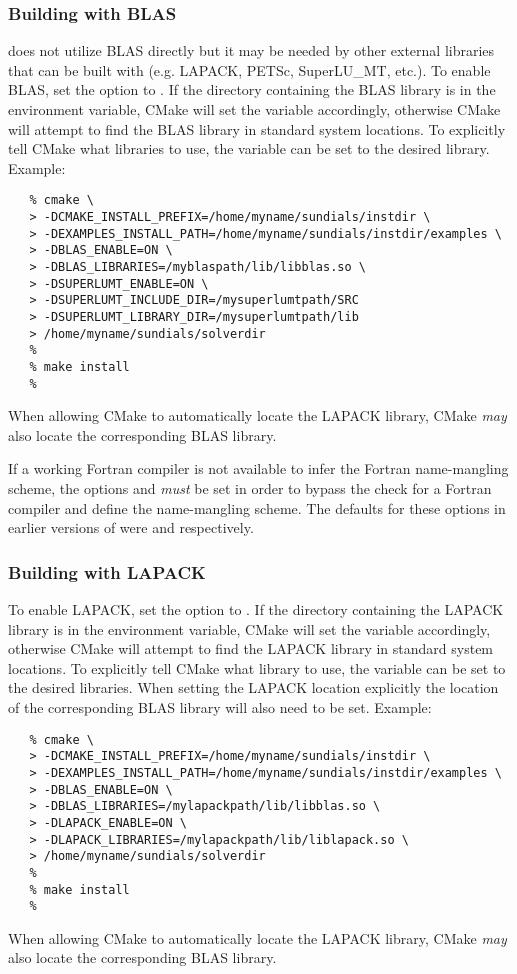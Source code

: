 \subsubsection*{Building with BLAS}
{\sundials} does not utilize BLAS directly but it may be needed by other
external libraries that {\sundials} can be built with (e.g. LAPACK,
PETSc, SuperLU\_MT, etc.). To enable BLAS, set the 
option to . If the directory containing the BLAS library is in
the  environment variable, CMake will set the
 variable accordingly, otherwise CMake will
attempt to find the BLAS library in standard system locations. To
explicitly tell CMake what libraries to use, the 
variable can be set to the desired library. Example:
\begin{verbatim}
   % cmake \
   > -DCMAKE_INSTALL_PREFIX=/home/myname/sundials/instdir \
   > -DEXAMPLES_INSTALL_PATH=/home/myname/sundials/instdir/examples \
   > -DBLAS_ENABLE=ON \
   > -DBLAS_LIBRARIES=/myblaspath/lib/libblas.so \
   > -DSUPERLUMT_ENABLE=ON \
   > -DSUPERLUMT_INCLUDE_DIR=/mysuperlumtpath/SRC
   > -DSUPERLUMT_LIBRARY_DIR=/mysuperlumtpath/lib
   > /home/myname/sundials/solverdir
   %
   % make install
   % 
\end{verbatim}
{\warn}When allowing CMake to automatically locate the LAPACK library,
CMake \textit{may} also locate the corresponding BLAS library.

If a working Fortran compiler is not available to infer the Fortran
name-mangling scheme, the options  and
\id{SUNDIALS\_F77\_FUNC\_UNDERSCORES} \textit{must} be set in order to
bypass the check for a Fortran compiler and define the name-mangling
scheme. The defaults for these options in earlier versions of
{\sundials} were \id{lower} and \id{one} respectively.


\subsubsection*{Building with LAPACK}
To enable LAPACK, set the \id{LAPACK\_ENABLE} option to .
If the directory containing the LAPACK library is in the
 environment variable, CMake will set the
 variable accordingly, otherwise CMake will
attempt to find the LAPACK library in standard system locations. To
explicitly tell CMake what library to use, the 
variable can be set to the desired libraries. {\warn}When setting
the LAPACK location explicitly the location of the corresponding BLAS
library will also need to be set. Example:
\begin{verbatim}
   % cmake \
   > -DCMAKE_INSTALL_PREFIX=/home/myname/sundials/instdir \
   > -DEXAMPLES_INSTALL_PATH=/home/myname/sundials/instdir/examples \
   > -DBLAS_ENABLE=ON \
   > -DBLAS_LIBRARIES=/mylapackpath/lib/libblas.so \
   > -DLAPACK_ENABLE=ON \
   > -DLAPACK_LIBRARIES=/mylapackpath/lib/liblapack.so \
   > /home/myname/sundials/solverdir
   %
   % make install
   % 
\end{verbatim}
{\warn}When allowing CMake to automatically locate the LAPACK library,
CMake \textit{may} also locate the corresponding BLAS library.

